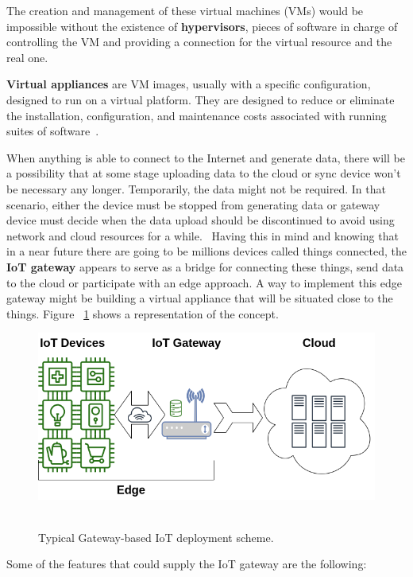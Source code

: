 The creation and management of these virtual machines (VMs) would be impossible without the existence of \textbf{hypervisors}, pieces of software in charge of controlling the VM and providing a connection for the virtual resource and the real one.

\textbf{Virtual appliances} are VM images, usually with a specific configuration, designed to run on a virtual platform. They are designed to reduce or eliminate the installation, configuration, and maintenance costs associated with running suites of software~\cite{GEN:Virtualization:2010}.

When anything is able to connect to the Internet and generate data, there will be a possibility that at some stage uploading data to the cloud or sync device won't be necessary any longer. Temporarily, the data might not be required. In that scenario, either the device must be stopped from generating data or gateway device must decide when the data upload should be discontinued to avoid using network and cloud resources for a while.~\cite{Ficloud:AazaamHuh:2014}
Having this in mind and knowing that in a near future there are going to be millions devices called things connected, the \textbf{IoT gateway} appears to serve as a bridge for connecting these things, send data to the cloud or participate with an edge approach. A way to implement this edge gateway might be building a virtual appliance that will be situated close to the things. Figure ~\ref{figure1.1} shows a representation of the concept.


\newpage
\begin{figure}[h]%
    \includegraphics[width=6.5in]{figures/iot_gateway.png}
~\caption{Typical Gateway-based IoT deployment scheme.}
\label{figure1.1}
\end{figure}

Some of the features that could supply the IoT gateway are the following:

